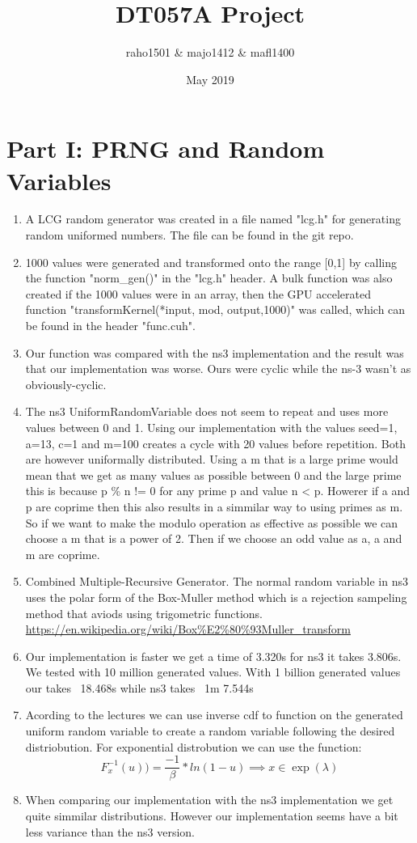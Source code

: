 \documentclass{article}
\title{DT057A Project}
\author{raho1501 \& majo1412 \& mafl1400}
\date{May 2019}
\begin{document}
\maketitle

\section{Part I: PRNG and Random Variables} \label{part1}
\begin{enumerate}
  \item A LCG random generator was created in a file named "lcg.h" for generating random uniformed numbers. The file can be found in the git repo.
  \item 1000 values were generated and transformed onto the range [0,1] by calling the function "norm\_gen()" in the "lcg.h" header. A bulk function was also created if the 1000 values were in an array, then the GPU accelerated function "transformKernel(*input, mod, output,1000)" was called, which can be found in the header "func.cuh".
  \item Our function was compared with the ns3 implementation and the result was that our implementation was worse. Ours were cyclic while the ns-3 wasn't as obviously-cyclic.
  \item The ns3 UniformRandomVariable does not seem to repeat and uses more values between 0 and 1. Using our implementation with the values seed=1, a=13, c=1 and m=100 creates a cycle with 20 values before repetition. Both are however uniformally distributed. Using a m that is a large prime would mean that we get as many values as possible between 0 and the large prime this is because p \% n != 0 for any prime p and value n < p. Howerer if a and p are coprime then this also results in a simmilar way to using primes as m. So if we want to make the modulo operation as effective as possible we can choose a m that is a power of 2. Then if we choose an odd value as a, a and m are coprime.
  \item Combined Multiple-Recursive Generator. The normal random variable in ns3 uses the polar form of the Box-Muller method which is a rejection sampeling method that aviods using trigometric functions. \url{https://en.wikipedia.org/wiki/Box\%E2\%80\%93Muller_transform}
  \item Our implementation is faster we get a time of 3.320s for ns3 it takes 3.806s. We tested with 10 million generated values. With 1 billion generated values our takes ~18.468s while ns3 takes ~1m 7.544s
  \item Acording to the lectures we can use inverse cdf to function on the generated uniform random variable to create a random variable following the desired distriobution. For exponential distrobution we can use the function:$$ F^{-1}_x(u)) = \frac{-1}{\beta} * ln(1-u) \implies x \in \exp{(\lambda)} $$
  \item When comparing our implementation with the ns3 implementation we get quite simmilar distributions. However our implementation seems have a bit less variance than the ns3 version.
\end{enumerate}
\end{document}
